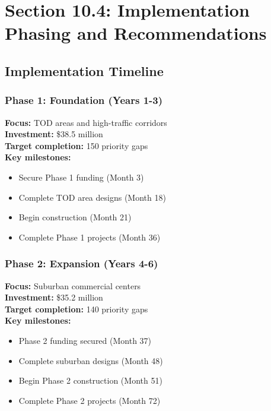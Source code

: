 \documentclass[11pt,letterpaper]{report}
\begin{document}
\chapter{Section 10.4: Implementation Phasing and Recommendations}

\section{Implementation Timeline}

\subsection{Phase 1: Foundation (Years 1-3)}
\textbf{Focus:} TOD areas and high-traffic corridors\\
\textbf{Investment:} \$38.5 million\\
\textbf{Target completion:} 150 priority gaps\\
\textbf{Key milestones:}
\begin{itemize}
    \item Secure Phase 1 funding (Month 3)
    \item Complete TOD area designs (Month 18)
    \item Begin construction (Month 21)
    \item Complete Phase 1 projects (Month 36)
\end{itemize}

\subsection{Phase 2: Expansion (Years 4-6)}
\textbf{Focus:} Suburban commercial centers\\
\textbf{Investment:} \$35.2 million\\
\textbf{Target completion:} 140 priority gaps\\
\textbf{Key milestones:}
\begin{itemize}
    \item Phase 2 funding secured (Month 37)
    \item Complete suburban designs (Month 48)
    \item Begin Phase 2 construction (Month 51)
    \item Complete Phase 2 projects (Month 72)
\end{itemize}
\end{document}
